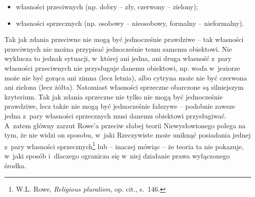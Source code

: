 \begin{itemize}
\item własności przeciwnych (np. dobry -- zły, czerwony -- zielony);
\item własności sprzecznych (np. osobowy -- nieosobowy, formalny -- nieformalny).
\end{itemize}
Tak jak zdania przeciwne nie mogą być jednocześnie prawdziwe -- tak własności przeciwnych nie można przypisać jednocześnie temu samemu obiektowi. Nie wyklucza to jednak sytuacji, w~której ani jedna, ani druga własność z~pary własności przeciwnych nie przysługuje danemu obiektowi, np. woda w~jeziorze może nie być gorąca ani zimna (lecz letnia), albo cytryna może nie być czerwona ani zielona (lecz żółta). Natomiast własności sprzeczne obarczone są silniejszym kryterium. Tak jak zdania sprzeczne nie tylko nie mogą być jednocześnie prawdziwe, lecz także nie mogą być jednocześnie fałszywe -- podobnie zawsze jedna z~pary własności sprzecznych musi danemu obiektowi przysługiwać. A~zatem główny zarzut Rowe'a przeciw słabej teorii Niewysłowionego polega na tym, że nie widzi on sposobu, w~jaki Rzeczywiste może uniknąć posiadania jednej z~pary własności sprzecznych\footnote{W.L. Rowe, \textit{Religious pluralism}, op. cit., s.~146.} lub -- inaczej mówiąc -- że teoria ta nie pokazuje, w~jaki sposób i~dlaczego ogranicza się w~niej działanie prawa wyłączonego środka.


